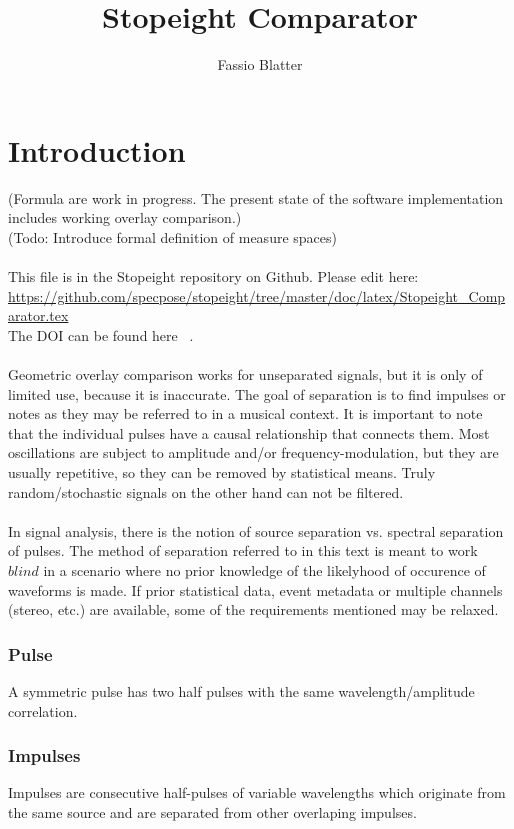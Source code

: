 \documentclass{report}
\begin{document}
\title{Stopeight Comparator}
\author{Fassio Blatter}
\maketitle

\chapter{Introduction}
(Formula are work in progress. The present state of the software implementation includes working overlay comparison.)\\
(Todo: Introduce formal definition of measure spaces)\\\\
This file is in the Stopeight repository on Github. Please edit here:\\
\href{https://github.com/specpose/stopeight/tree/master/doc/latex/Stopeight\_Comparator.tex}{https://github.com/specpose/stopeight/tree/master/doc/latex/Stopeight\_Comparator.tex}\\
The DOI can be found here ~\cite{Stopeight}.\\\\
Geometric overlay comparison works for unseparated signals, but it is only of limited use, because it is inaccurate. The goal of separation is to find impulses or notes as they may be referred to in a musical context. It is important to note that the individual pulses have a causal relationship that connects them. Most oscillations are subject to amplitude and/or frequency-modulation, but they are usually repetitive, so they can be removed by statistical means. Truly random/stochastic signals on the other hand can not be filtered.\\\\
In signal analysis, there is the notion of source separation vs. spectral separation of pulses. The method of separation referred to in this text is meant to work $blind$ in a scenario where no prior knowledge of the likelyhood of occurence of waveforms is made. If prior statistical data, event metadata or multiple channels (stereo, etc.) are available, some of the requirements mentioned may be relaxed.

\subsection{Pulse}
A symmetric pulse has two half pulses with the same wavelength/amplitude correlation.

\subsection{Impulses}
Impulses are consecutive half-pulses of variable wavelengths which originate from the same source and are separated from other overlaping impulses.
\end{document}
